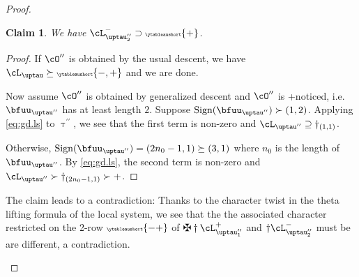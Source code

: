 \documentclass[12pt,a4paper]{amsart}
\numberwithin{equation}{section}
\newtheorem{claim}[thm]{Claim}
\theoremstyle{remark}
\def\ssign{\mathrm{Sign}}
\let\ytb=\ytableaushort
\newcommand{\tytb}[1]{{\tiny\ytb{#1}}}
\def\cOpp{\cO^{\prime\prime}}
\def\pcL{\cL^+}
\def\ncL{\cL^-}
\def\uptaupp{\uptau^{\prime\prime}}
\begin{document}
\begin{proof}
\begin{enumPF}
\begin{enumPF}
    \begin{claim}\label{c:d+}
      We have $\ncL_{\uptaupp_{2}}\supset \tytb{+}$.
    \end{claim}
    \begin{proof}
      If $\cOpp$ is obtained by the usual descent, we have
      $\cL_{\uptau}\succeq \tytb{-,+}$ and we are done.

      Now assume $\cOpp$ is obtained by generalized descent and $\cOpp$ is
      +noticed, i.e. $\bfuu_{\uptaupp}$ has at least length $2$.
      Suppose $\ssign( \bfuu_{\uptaupp} )\succ (1,2)$. Applying \eqref{eq:gd.ls} to $\uptaupp$,
      we see that the first term is non-zero and
      $\cL_{\uptaupp}\supseteq \dagger_{(1,1)}$.

      Otherwise, $\ssign( \bfuu_{\uptaupp} ) = (2n_{0}-1,1)\succeq (3,1)$ where $n_{0}$ is the
      length of $\bfuu_{\uptaupp}$. By \eqref{eq:gd.ls}, the second term is
      non-zero and $\cL_{\uptaupp}\succ \dagger_{(2n_{0}-1,1)}\succ +$.
    \end{proof}

    The claim leads to a contradiction: Thanks to the character twist in the theta
    lifting formula of the local system, we see that the the associated
    character restricted on the 2-row $\tytb{-+}$ of $\maltese \dagger \pcL_{\uptaupp_{1}}$ and
    $\dagger \ncL_{\uptaupp_{2}}$ must be are different, a contradiction.


\end{enumPF}
\end{enumPF}
\end{proof}
\end{document}
